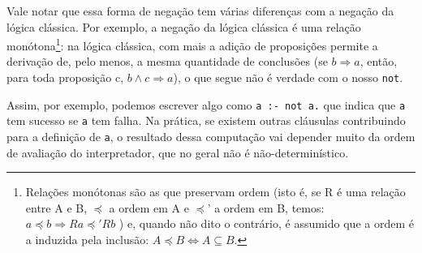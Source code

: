 \documentclass{article}
\theoremstyle{definition}
\theoremstyle{remark}
\begin{document}
Vale notar que essa forma de negação tem várias diferenças com a negação da lógica clássica. Por exemplo, a negação da lógica clássica é uma relação monótona\footnote{Relações monótonas são as que preservam ordem (isto é, se R é uma relação entre A e B, $\preceq$ a ordem em A e $\preceq$' a ordem em B, temos: $a \preceq b \Rightarrow Ra \preceq' Rb$ ) e, quando não dito o contrário, é assumido que a ordem é a induzida pela inclusão: $A \preceq B \Leftrightarrow A \subseteq B$.}: na lógica clássica, com mais a adição de proposições permite a derivação de, pelo menos, a mesma quantidade de conclusões (se $b \Rightarrow a$, então, para toda proposição c, $b \wedge c \Rightarrow a$), o que segue não é verdade com o nosso {\tt not}.

Assim, por exemplo, podemos escrever algo como {\tt a :- not a.} que indica que {\tt a} tem sucesso se {\tt a} tem falha. Na prática, se existem outras cláusulas contribuindo para a definição de {\tt a}, o resultado dessa computação vai depender muito da ordem de avaliação do interpretador, que no geral não é não-determinístico.
\end{document}
